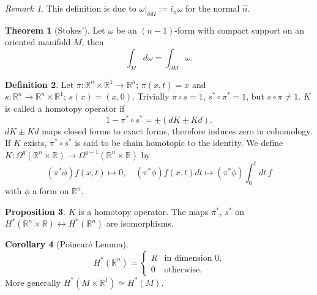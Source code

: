\documentclass[twocolumn]{article}
\theoremstyle{definition}
\newtheorem{definition}{Definition}[section]
\newtheorem{theorem}[definition]{Theorem}
\newtheorem{proposition}[definition]{Proposition}
\newtheorem{corollary}[definition]{Corollary}
\theoremstyle{remark}
\newtheorem*{remark}{Remark}
\begin{document}
\begin{remark}
    This definition is due to $\omega|_{\partial M} := i_{\hat{n}} \omega$ for the normal $\hat{n}$.
\end{remark}
\begin{theorem}[Stokes']
    Let $\omega$ be an $(n-1)$-form with compact support on an oriented manifold $M$, then
    \begin{equation}
        \int_M d\omega = \int_{\partial M} \omega.
    \end{equation}
\end{theorem}

\begin{definition}
    Let $\pi: \mathbb{R}^n \times \mathbb{R}^1 \rightarrow \mathbb{R}^n;\, \pi(x, t) = x$ and
    $s: \mathbb{R}^n \rightarrow \mathbb{R}^n \times \mathbb{R}^1;\, s(x) = (x, 0)$.
    Trivially $\pi \circ s = 1$, $s^* \circ \pi^* = 1$, but $s \circ \pi \neq 1$.
    $K$ is called a homotopy operator if
    \begin{equation}
        1 - \pi^* \circ s^* = \pm(dK \pm Kd).
    \end{equation}
    $dK \pm Kd$ maps closed forms to exact forms, therefore induces zero in cohomology.
    If $K$ exists, $\pi^* \circ s^*$ is said to be chain homotopic to the identity.
    We define $K: \Omega^q(\mathbb{R}^n \times \mathbb{R}) \rightarrow \Omega^{q-1}(\mathbb{R}^n \times \mathbb{R})$ by
    \begin{equation}
        (\pi^* \phi)f(x, t) \mapsto 0,\quad
        (\pi^* \phi)f(x, t) dt \mapsto (\pi^* \phi) \int^t_0 dt\, f
    \end{equation}
    with $\phi$ a form on $\mathbb{R}^n$.
\end{definition}
\begin{proposition}
    $K$ is a homotopy operator.
    The maps $\pi^*$, $s^*$ on $H^*(\mathbb{R}^n \times \mathbb{R}) \leftrightarrow H^*(\mathbb{R}^n)$ are isomorphisms.
\end{proposition}
\begin{corollary}[Poincaré Lemma]
    \begin{equation}
        H^*(\mathbb{R}^n) =
        \begin{cases}
            R & \textrm{in dimension 0,}\\
            0 & \textrm{otherwise.}
        \end{cases}
    \end{equation}
    More generally $H^*(M \times \mathbb{R}^1) \simeq H^*(M)$.
\end{corollary}
\end{document}
